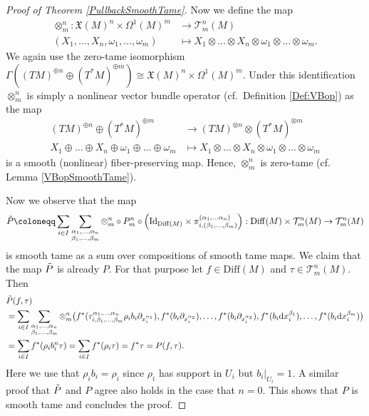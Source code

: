 \documentclass[12pt,a4paper]{article}
\theoremstyle{plain}
\theoremstyle{definition}
\newcommand{\tens}{\otimes}
\newcommand{\del}{\partial}
\newcommand{\om}{\omega}
\newcommand{\VFs}{\mathfrak{X}(M)}
\newcommand{\Forms}[1]{\Omega^{#1}(M)}
\newcommand{\Diff}{\mathrm{Diff}(M)}
\newcommand{\tensf}[2]{\mathcal{T}^{#1}_{#2}(M)}
\renewcommand{\d}{\mathrm{d}}
\begin{document}
\begin{proof}[Proof of Theorem \ref{PullbackSmoothTame}]
Now we define the map
\begin{align*}
    \tens_m^n:\VFs^n\times \Forms{1}^m&\longrightarrow \tensf{n}{m}\\
    (X_1,\ldots,X_n,\om_1,\ldots,\om_m)&\longmapsto X_1\tens\ldots\tens X_n \tens \om_1\tens\ldots\tens \om_m.
\end{align*}
We again use the zero-tame isomorphism
$\Gamma((TM)^{\oplus n}\oplus (T^*M)^{\oplus m})\cong \VFs^n\times \Forms{1}^m$. Under this identification $\tens^n_m$ is simply a nonlinear vector bundle operator (cf.~Definition \ref{Def:VBop}) as the map 
\begin{align*}
    (TM)^{\oplus n}\oplus(T^*M)^{\oplus m}&\longrightarrow (TM)^{\tens n}\tens (T^*M)^{\tens m}\\
    X_1\oplus\ldots\oplus X_n\oplus \om_1\oplus\ldots\oplus \om_m&\longmapsto X_1\tens\ldots\tens X_n \tens \om_1\tens\ldots\tens \om_m
\end{align*}
is a smooth (nonlinear) fiber-preserving map. Hence, $\tens^n_m$ is zero-tame (cf. Lemma \ref{VBopSmoothTame}).

Now we observe that the map 
\begin{align*}
    \Tilde{P}\coloneqq \sum_{i\in I}\sum_{\substack{\alpha_1,\ldots,\alpha_n\\\beta_1,\ldots,\beta_m}} \tens^n_m\circ P_m^n\circ \left(\mathrm{Id}_{\Diff} \times \pi^{(\alpha_1,\ldots\alpha_n)}_{i,(\beta_1,\ldots,\beta_m)}\right):\Diff\times \tensf{n}{m}\to \tensf{n}{m}
\end{align*}
is smooth tame as a sum over compositions of smooth tame maps.
We claim that the map $\Tilde{P}$ is already $P$. For that purpose let $f\in \Diff$ and $\tau\in \tensf{n}{m}$. Then 
\begin{align*}
    &\Tilde{P}(f,\tau)\\
    &= \sum_{i\in I}\sum_{\substack{\alpha_1,\ldots,\alpha_n\\\beta_1,\ldots,\beta_m}} \tens^n_m\big{(} f^*(\tau^{\alpha_1,\ldots,\alpha_n}_{i,\beta_1,\ldots,\beta_m}\rho_ib_i \del_{x_i^{\alpha_1}}),f^*(b_i\del_{x_i^{\alpha_2}}),\ldots,f^*(b_i\del_{x_i^{\alpha_2}}),f^*(b_i \d x_i^{\beta_1}),\ldots,f^*(b_i \d x_i^{\beta_m})\big{)}\\
    &=\sum_{i\in I}f^*(\rho_ib_i^n \tau)=\sum_{i\in I}f^*(\rho_i\tau)=f^*\tau=P(f,\tau).
\end{align*}
Here we use that $\rho_ib_i=\rho_i$ since $\rho_i$ has support in $U_i$ but $\left.b_i\right|_{U_i}=1$. A similar proof that $\Tilde{P}$ and $P$ agree also holds in the case that $n=0$.
This shows that $P$ is smooth tame and concludes the proof.

\end{proof}
\end{document}
